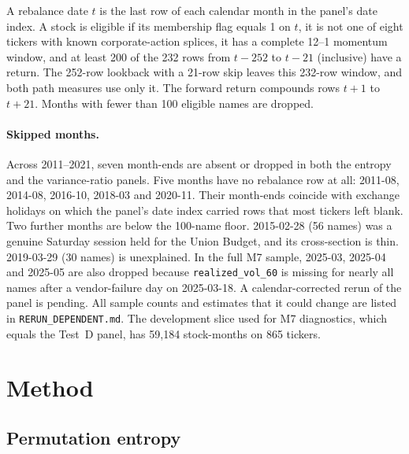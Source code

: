 \documentclass[11pt]{article}
\begin{document}
A rebalance date $t$ is the last row of each calendar month in the panel's date index.
A stock is eligible if its membership flag equals 1 on $t$, it is not one of eight tickers
with known corporate-action splices, it has a complete 12--1 momentum window, and at least
200 of the 232 rows from $t-252$ to $t-21$ (inclusive) have a return. The 252-row lookback
with a 21-row skip leaves this 232-row window, and both path measures use only it. The
forward return compounds rows $t+1$ to $t+21$. Months with fewer than 100 eligible names
are dropped.

\paragraph{Skipped months.} Across 2011--2021, seven month-ends are absent or dropped in
both the entropy and the variance-ratio panels. Five months have no rebalance row at all:
2011-08, 2014-08, 2016-10, 2018-03 and 2020-11. Their month-ends coincide with exchange
holidays on which the panel's date index carried rows that most tickers left blank. Two
further months are below the 100-name floor. 2015-02-28 (56 names) was a genuine Saturday
session held for the Union Budget, and its cross-section is thin. 2019-03-29 (30 names) is
unexplained. In the full M7 sample, 2025-03, 2025-04 and 2025-05 are also dropped because
\texttt{realized\_vol\_60} is missing for nearly all names after a vendor-failure day on
2025-03-18. A calendar-corrected rerun of the panel is pending. All sample counts and
estimates that it could change are listed in \texttt{RERUN\_DEPENDENT.md}. The development
slice used for M7 diagnostics, which equals the Test~D panel, has 59,184 stock-months on
865 tickers.

\section{Method}
\label{sec:method}

\subsection{Permutation entropy}
\end{document}
